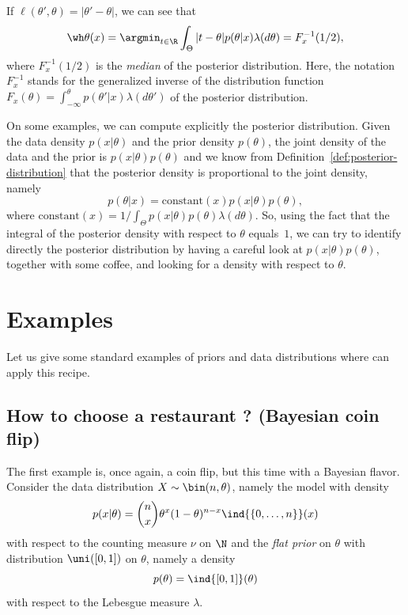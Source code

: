 If $\ell(\theta', \theta) = |\theta' - \theta|$, we can see that
\begin{equation*}
	\wh \theta(x) = \argmin_{t \in \R} \int_\Theta |t - \theta| p(\theta | x) \lambda(d \theta) = F_{x}^{-1}(1/2),
\end{equation*}
where $F_{x}^{-1}(1/2)$ is the \emph{median} of the posterior distribution.
Here, the notation $F_x^{-1}$ stands for the generalized inverse of the distribution function $F_x(\theta) = \int_{-\infty}^\theta p(\theta' | x) \lambda(d \theta')$ of the posterior distribution.%

\begin{recipe}
	On some examples, we can compute explicitly the posterior distribution.
	Given the data density $p(x | \theta)$ and the prior density $p(\theta)$, the joint density of the data and the prior is $p(x | \theta) p(\theta)$ and we know from Definition~\ref{def:posterior-distribution} that the posterior density is proportional to the joint density, namely 
	\begin{equation*}
		p(\theta | x) = \mathrm{constant}(x) p(x | \theta) p(\theta),
	\end{equation*}
	where $\mathrm{constant}(x) =  1 / \int_\Theta p(x | \theta) p(\theta) \lambda(d \theta)$. 
	So, using the fact that the integral of the posterior density with respect to $\theta$ equals~$1$, we can try to identify directly the posterior distribution by having a careful look at $p(x | \theta) p(\theta)$, together with some coffee, and looking for a density with respect to $\theta$.
\end{recipe}

\section{Examples} %
\label{sec:bayesian-examples}


Let us give some standard examples of priors and data distributions where can apply this recipe.

\subsection{How to choose a restaurant ? (Bayesian coin flip)}
\label{sub:bayesian-coin-flip}


The first example is, once again, a coin flip, but this time with a Bayesian flavor.
Consider the data distribution $X \sim \bin(n, \theta)$, namely the model with density
\begin{equation*}
	p(x | \theta) = \binom{n}{x} \theta^x (1 - \theta)^{n-x} \ind{\{ 0, \ldots, n\}}(x)	
\end{equation*}
with respect to the counting measure $\nu$ on $\N$ and the \emph{flat prior} on $\theta$ with distribution $\uni([0, 1])$ on $\theta$, namely a density
\begin{equation*}
	p(\theta) = \ind{[0, 1]}(\theta)
\end{equation*}
with respect to the Lebesgue measure $\lambda$.

